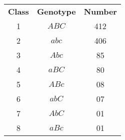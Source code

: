 \begin{center}
\begin{tabular}{|c|c|c|}

\textbf{Class} & \textbf{Genotype} & \textbf{Number} \\

1 & $ABC$ & 412 \\
2 & $abc$ & 406 \\
3 & $Abc$ & 85 \\
4 & $aBC$ & 80 \\
5 & $ABc$ & 08 \\
6 & $abC$ & 07 \\
7 & $AbC$ & 01 \\
8 & $aBc$ & 01 \\

\end{tabular}
\end{center}